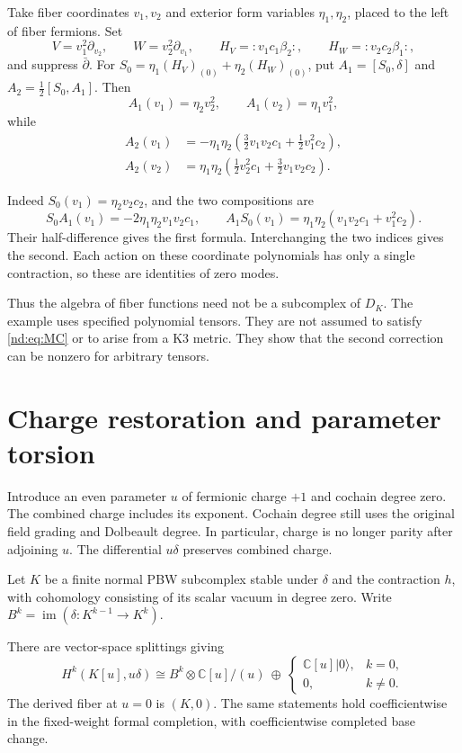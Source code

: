 \begin{example}\label{nd:ex:second}
Take fiber coordinates $v_1,v_2$ and exterior form variables
$\eta_1,\eta_2$, placed to the left of fiber fermions. Set
\[
 V=v_1^2\partial_{v_2},\qquad W=v_2^2\partial_{v_1},\qquad
 H_V=:v_1c_1\beta_2:,\qquad H_W=:v_2c_2\beta_1:,
\]
and suppress $\bar\partial$. For
$S_0=\eta_1(H_V)_{(0)}+\eta_2(H_W)_{(0)}$, put
$A_1=[S_0,\delta]$ and $A_2=\tfrac12[S_0,A_1]$.
Then
\[
 A_1(v_1)=\eta_2v_2^2,\qquad
 A_1(v_2)=\eta_1v_1^2,
\]
while
\begin{align*}
 A_2(v_1)&=-\eta_1\eta_2
       \left(\tfrac32v_1v_2c_1+\tfrac12v_1^2c_2\right),\\
 A_2(v_2)&=\eta_1\eta_2
       \left(\tfrac12v_2^2c_1+\tfrac32v_1v_2c_2\right).
\end{align*}

Indeed $S_0(v_1)=\eta_2v_2c_2$, and the two compositions are
\[
 S_0A_1(v_1)=-2\eta_1\eta_2v_1v_2c_1,\qquad
 A_1S_0(v_1)=\eta_1\eta_2(v_1v_2c_1+v_1^2c_2).
\]
Their half-difference gives the first formula. Interchanging the two
indices gives the second. Each action on these coordinate polynomials
has only a single contraction, so these are identities of zero modes.
\end{example}

Thus the algebra of fiber functions need not be a subcomplex of
$D_K$. The example uses specified polynomial tensors. They are not
assumed to satisfy \eqref{nd:eq:MC} or to arise from a K3 metric.
They show that the second correction can be nonzero for arbitrary
tensors.

\section{Charge restoration and parameter torsion}
\label{nd:sec:charge}

Introduce an even parameter $u$ of fermionic charge $+1$ and
cochain degree zero. The combined charge includes its exponent.
Cochain degree still uses the original field grading and Dolbeault
degree. In particular, charge is no longer parity after adjoining $u$.
The differential $u\delta$ preserves combined charge.

Let $K$ be a finite normal PBW subcomplex stable under $\delta$ and
the contraction $h$, with cohomology consisting of its scalar vacuum
in degree zero. Write
$B^k=\operatorname{im}(\delta:K^{k-1}\to K^k)$.

\begin{proposition}\label{nd:prop:torsion}
There are vector-space splittings giving
\begin{equation}\label{nd:eq:torsion}
 H^k(K[u],u\delta)\cong
 B^k\otimes\mathbb C[u]/(u)\ \oplus\
 \begin{cases}
 \mathbb C[u]|0\rangle,&k=0,\\
 0,&k\ne0.
 \end{cases}
\end{equation}
The derived fiber at $u=0$ is $(K,0)$.
The same statements hold coefficientwise in the fixed-weight formal
completion, with coefficientwise completed base change.
\end{proposition}

